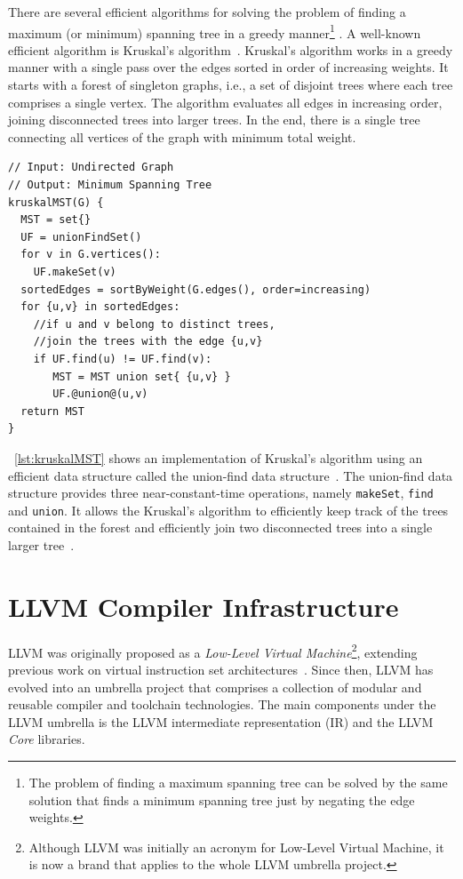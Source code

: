 There are several efficient algorithms for solving the problem of finding a maximum (or minimum) spanning tree in a greedy manner\footnote{The problem of finding a maximum spanning tree can be solved by the same solution that finds a minimum spanning tree just by negating the edge weights.} \citep{bazlamacci01}.
A well-known efficient algorithm is Kruskal's algorithm~\citep{kruskal56}.
Kruskal's algorithm works in a greedy manner with a single pass over the edges sorted in order of increasing weights.
It starts with a forest of singleton graphs, i.e., a set of disjoint trees where each tree comprises a single vertex.
The algorithm evaluates all edges in increasing order, joining disconnected trees into larger trees.
In the end, there is a single tree connecting all vertices of the graph with minimum total weight.

\begin{lstlisting}[caption={Kruskal's algorithm for finding a minimum spanning tree}, label={lst:kruskalMST}, float]
// Input: Undirected Graph
// Output: Minimum Spanning Tree
kruskalMST(G) {
  MST = set{}
  UF = unionFindSet()
  for v in G.vertices():
    UF.makeSet(v)
  sortedEdges = sortByWeight(G.edges(), order=increasing)
  for {u,v} in sortedEdges:
    //if u and v belong to distinct trees,
    //join the trees with the edge {u,v}
    if UF.find(u) != UF.find(v):
       MST = MST union set{ {u,v} }
       UF.@union@(u,v)
  return MST
}
\end{lstlisting}

\lstlistingname~\ref{lst:kruskalMST} shows an implementation of Kruskal's algorithm using an efficient data structure called the union-find data structure~\citep{hopcroft73,tarjan75}.
The union-find data structure provides three near-constant-time operations, namely \verb|makeSet|, \verb|find| and \verb|union|.
It allows the Kruskal's algorithm to efficiently keep track of the trees contained in the forest and efficiently join two disconnected trees into a single larger tree~\citep{galil91}.

\section{LLVM Compiler Infrastructure}

LLVM was originally proposed as a \textit{Low-Level Virtual Machine}\footnote{Although LLVM was initially an acronym for Low-Level Virtual Machine, it is now a brand that applies to the whole LLVM umbrella project.}, extending previous work on virtual instruction set architectures~\citep{adve03,lattner04}.
Since then, LLVM has evolved into an umbrella project that comprises a collection of modular and reusable compiler and toolchain technologies.
The main components under the LLVM umbrella is the LLVM intermediate representation (IR) and the LLVM \textit{Core} libraries.

